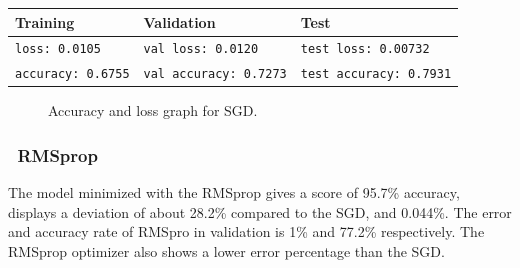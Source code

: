 \documentclass[lnbip]{svmultln}
\newcommand{\myfloatalign}{\centering}
\begin{document}
	
	\begin{table}[H]
		\centering
		\begin{tabular}{l|l|l}
			\hline
			\textbf{Training} & \textbf{Validation} & \textbf{Test} \\
			\hline
			
			\texttt{loss: 0.0105} & \texttt{val loss: 0.0120} & \texttt{test loss: 0.00732} \\
			\texttt{accuracy: 0.6755} & \texttt{val accuracy: 0.7273} & \texttt{test accuracy: 0.7931} \\
			
			\hline
			
		\end{tabular}
	\end{table}
	
	\begin{figure}[H]
		\myfloatalign
		 \quad
		
		\caption{Accuracy and loss graph for SGD.}
	\end{figure}

	
	\subsubsection*{\qquad \textbullet \ \textbf{RMSprop}}
	
	The model minimized with the RMSprop gives a score of 95.7\% accuracy, displays a deviation of about 28.2\% compared to the SGD, and 0.044\%. The error and accuracy rate of RMSpro in validation is 1\% and 77.2\% respectively. The RMSprop optimizer also shows a lower error percentage than the SGD.
	
\end{document}
